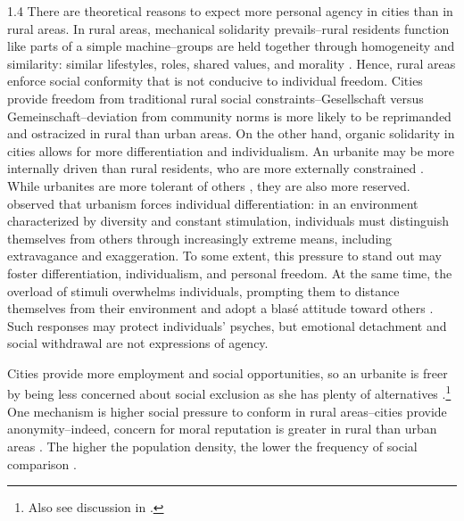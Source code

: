 \documentclass[10pt, letterpaper]{article}
\begin{document}
\begin{spacing}{1.4}
There are theoretical reasons to expect more personal agency in cities than in rural areas. In rural areas, mechanical solidarity prevails--rural residents function like parts of a simple machine--groups are held together through homogeneity and similarity:
similar lifestyles, roles, shared values, and morality
\citep{durkheim97}. Hence, rural areas enforce social conformity that is not conducive to individual freedom.
 Cities provide freedom from traditional rural social constraints--Gesellschaft versus Gemeinschaft--deviation from community norms is more likely to be reprimanded and ostracized in rural than urban areas.
On the other hand, organic solidarity in cities allows for more differentiation and individualism. %
%
An urbanite may be more internally driven than rural residents, who are more externally constrained \citep{yamagishi12}.
%
While urbanites are more tolerant of others \citep{tuch87},  they are also more reserved.
 \citet{simmel03} observed that urbanism forces individual differentiation: in an environment characterized by diversity and constant stimulation, individuals must distinguish themselves from others through increasingly extreme means, including extravagance and exaggeration. To some extent, this pressure to stand out may foster differentiation, individualism, and personal freedom. At the same
time, the overload of stimuli overwhelms individuals, prompting them to distance themselves from their environment and adopt a blas\'{e} attitude toward others
 \citep{simmel03}. Such responses may protect individuals' psyches, but emotional detachment and social withdrawal are not expressions of agency.
% 

Cities provide more employment and social opportunities, so an urbanite is freer by being less concerned about social exclusion as she has plenty of alternatives \citep{yamagishi12}.\footnote{Also see discussion in \citet{luca2023progressive}.} %
 One mechanism is higher social pressure to conform in rural areas--cities provide anonymity--indeed, concern for moral reputation is greater in rural than urban areas
 \citep[][]{aokOttCh26}. %
 The higher the population density, the lower the frequency of social comparison \citep[][]{aokOttCh26}. %
 

\end{spacing}
\end{document}
